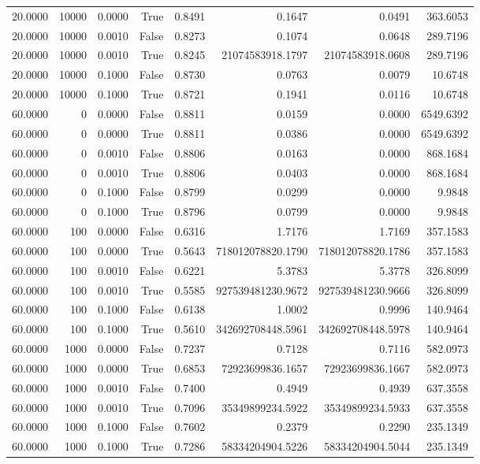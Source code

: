 \begin{table}
\begin{tabular}{rrrrrrrr}
20.0000 & 10000 & 0.0000 & True & 0.8491 & 0.1647 & 0.0491 & 363.6053 \\
20.0000 & 10000 & 0.0010 & False & 0.8273 & 0.1074 & 0.0648 & 289.7196 \\
20.0000 & 10000 & 0.0010 & True & 0.8245 & 21074583918.1797 & 21074583918.0608 & 289.7196 \\
20.0000 & 10000 & 0.1000 & False & 0.8730 & 0.0763 & 0.0079 & 10.6748 \\
20.0000 & 10000 & 0.1000 & True & 0.8721 & 0.1941 & 0.0116 & 10.6748 \\
60.0000 & 0 & 0.0000 & False & 0.8811 & 0.0159 & 0.0000 & 6549.6392 \\
60.0000 & 0 & 0.0000 & True & 0.8811 & 0.0386 & 0.0000 & 6549.6392 \\
60.0000 & 0 & 0.0010 & False & 0.8806 & 0.0163 & 0.0000 & 868.1684 \\
60.0000 & 0 & 0.0010 & True & 0.8806 & 0.0403 & 0.0000 & 868.1684 \\
60.0000 & 0 & 0.1000 & False & 0.8799 & 0.0299 & 0.0000 & 9.9848 \\
60.0000 & 0 & 0.1000 & True & 0.8796 & 0.0799 & 0.0000 & 9.9848 \\
60.0000 & 100 & 0.0000 & False & 0.6316 & 1.7176 & 1.7169 & 357.1583 \\
60.0000 & 100 & 0.0000 & True & 0.5643 & 718012078820.1790 & 718012078820.1786 & 357.1583 \\
60.0000 & 100 & 0.0010 & False & 0.6221 & 5.3783 & 5.3778 & 326.8099 \\
60.0000 & 100 & 0.0010 & True & 0.5585 & 927539481230.9672 & 927539481230.9666 & 326.8099 \\
60.0000 & 100 & 0.1000 & False & 0.6138 & 1.0002 & 0.9996 & 140.9464 \\
60.0000 & 100 & 0.1000 & True & 0.5610 & 342692708448.5961 & 342692708448.5978 & 140.9464 \\
60.0000 & 1000 & 0.0000 & False & 0.7237 & 0.7128 & 0.7116 & 582.0973 \\
60.0000 & 1000 & 0.0000 & True & 0.6853 & 72923699836.1657 & 72923699836.1667 & 582.0973 \\
60.0000 & 1000 & 0.0010 & False & 0.7400 & 0.4949 & 0.4939 & 637.3558 \\
60.0000 & 1000 & 0.0010 & True & 0.7096 & 35349899234.5922 & 35349899234.5933 & 637.3558 \\
60.0000 & 1000 & 0.1000 & False & 0.7602 & 0.2379 & 0.2290 & 235.1349 \\
60.0000 & 1000 & 0.1000 & True & 0.7286 & 58334204904.5226 & 58334204904.5044 & 235.1349 \\

\end{tabular}
\end{table}
